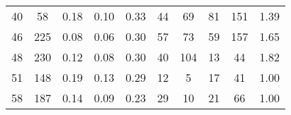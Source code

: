 \begin{tabular}{lccccccccc}
40 &       58 &                             0.18 &                             0.10 &                             0.33 &              44 &              69 &                                 81 &                             151 &       1.39 \\
46 &      225 &                             0.08 &                             0.06 &                             0.30 &              57 &              73 &                                 59 &                             157 &       1.65 \\
48 &      230 &                             0.12 &                             0.08 &                             0.30 &              40 &             104 &                                 13 &                              44 &       1.82 \\
51 &      148 &                             0.19 &                             0.13 &                             0.29 &              12 &               5 &                                 17 &                              41 &       1.00 \\
58 &      187 &                             0.14 &                             0.09 &                             0.23 &              29 &              10 &                                 21 &                              66 &       1.00 \\
\bottomrule
\end{tabular}
